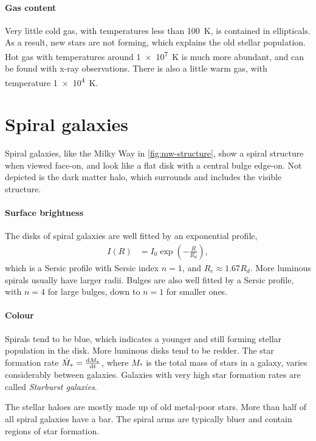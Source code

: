 \paragraph*{Gas content}
Very little cold gas, with temperatures less than \SI{100}{\kelvin}, is contained in ellipticals.
As a result, new stars are not forming, which explains the old stellar population.
Hot gas with temperatures around \SI{1e7}{\kelvin} is much more abundant, and can be found with x-ray observations.
There is also a little warm gas, with temperature \SI{1e4}{\kelvin}.







\section{Spiral galaxies}
Spiral galaxies, like the Milky Way in \cref{fig:mw-structure}, show a spiral structure when viewed face-on, and look like a flat disk with a central bulge edge-on.
Not depicted is the dark matter halo, which surrounds and includes the visible structure.

\paragraph{Surface brightness}
The disks of spiral galaxies are well fitted by an exponential profile,
\begin{align*}
	I(R)
	&= I_0 \exp\left( -\frac{R}{R_d} \right),
\end{align*}
which is a Sersic profile with Sersic index $n=1$,
and $R_e \approx 1.67 R_d$.
More luminous spirals usually have larger radii.
Bulges are also well fitted by a Sersic profile, with $n = 4$ for large bulges, down to $n=1$ for smaller ones.

\paragraph*{Colour}
Spirals tend to be blue, which indicates a younger and still forming stellar population in the disk.
More luminous disks tend to be redder.
The star formation rate $\dot{M}_* = \dv{M_*}{t}$, where $M_*$ is the total mass of stars in a galaxy, varies considerably between galaxies.
Galaxies with very high star formation rates are called \emph{Starburst galaxies}.

The stellar haloes are mostly made up of old metal-poor stars.
More than half of all spiral galaxies have a bar.
The spiral arms are typically bluer and contain regions of star formation.

